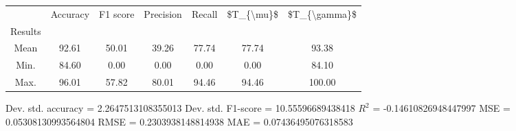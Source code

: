 \begin{tabular}{|c|c|c|c|c|c|c|}
\toprule
{} &  Accuracy &  F1 score &  Precision &  Recall &  \$T\_\{\textbackslash mu\}\$ &  \$T\_\{\textbackslash gamma\}\$ \\
Results &           &           &            &         &            &               \\
\hline
Mean    &     92.61 &     50.01 &      39.26 &   77.74 &      77.74 &         93.38 \\
Min.    &     84.60 &      0.00 &       0.00 &    0.00 &       0.00 &         84.10 \\
Max.    &     96.01 &     57.82 &      80.01 &   94.46 &      94.46 &        100.00 \\
\bottomrule
\end{tabular}

 Dev. std. accuracy = 2.2647513108355013
 Dev. std. F1-score = 10.55596689438418
 $R^2$ = -0.14610826948447997
 MSE = 0.05308130993564804
 RMSE = 0.2303938148814938
 MAE = 0.07436495076318583